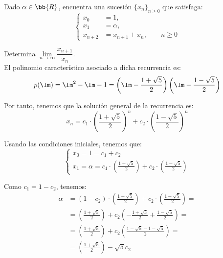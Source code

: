 \begin{ejercicio}
    Dado $\alpha\in \bb{R}$, encuentra una sucesión $\{x_n\}_{n\geq 0}$ que satisfaga:
    \begin{equation*}
        \left\{
            \begin{array}{rl}
                x_0&=1,\\
                x_1&=\alpha,\\
                x_{n+2}&= x_{n+1} + x_n,\qquad n\geq 0
            \end{array}
        \right.
    \end{equation*}

    Determina $\lim\limits_{n\to\infty} \dfrac{x_{n+1}}{x_n}$.\\

    El polinomio característico asociado a dicha recurrencia es:
    \begin{equation*}
        p(\lm) = \lm^2-\lm -1 = \left(\lm -\frac{1+\sqrt{5}}{2}\right)\left(\lm -\frac{1-\sqrt{5}}{2}\right)
    \end{equation*}

    Por tanto, tenemos que la solución general de la recurrencia es:
    \begin{equation*}
        x_n = c_1\cdot \left(\frac{1+\sqrt{5}}{2}\right)^n + c_2\cdot \left(\frac{1-\sqrt{5}}{2}\right)^n
    \end{equation*}

    Usando las condiciones iniciales, tenemos que:
    \begin{equation*}
        \left\{
        \begin{array}{l}
            x_0=1=c_1+c_2\\
            x_1=\alpha=c_1\cdot \left(\frac{1+\sqrt{5}}{2}\right) + c_2\cdot \left(\frac{1-\sqrt{5}}{2}\right)
        \end{array}
        \right.
    \end{equation*}

    Como $c_1=1-c_2$, tenemos:
    \begin{align*}
        \alpha&=(1-c_2)\cdot \left(\frac{1+\sqrt{5}}{2}\right) + c_2\cdot \left(\frac{1-\sqrt{5}}{2}\right)
        =\\&= \left(\frac{1+\sqrt{5}}{2}\right) + c_2\left(-\frac{1+\sqrt{5}}{2}+\frac{1-\sqrt{5}}{2}\right)
        =\\&= \left(\frac{1+\sqrt{5}}{2}\right) + c_2\left(\frac{1-\sqrt{5}-1-\sqrt{5}}{2}\right)
        =\\&= \left(\frac{1+\sqrt{5}}{2}\right) - \sqrt{5}c_2
    \end{align*}


\end{ejercicio}
